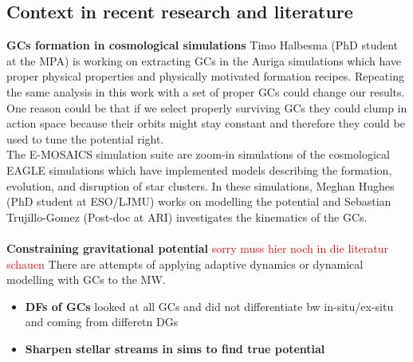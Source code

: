 \subsection{Context in recent research and literature}
\textbf{\acp{GC} formation in cosmological simulations} Timo Halbesma (PhD student at the MPA) is working on extracting \acp{GC} in the Auriga simulations which have proper physical properties and physically motivated formation recipes. Repeating the same analysis in this work with a set of proper \acp{GC} could change our results. One reason could be that if we select properly surviving \acp{GC} they could clump in action space because their orbits might stay constant and therefore they could be used to tune the potential right.\\
The E-MOSAICS simulation suite \citep{Pfeffer...E-MOSAICS...2018, Kruijssen...E-MOSAICS.MW..2018} are zoom-in simulations of the cosmological EAGLE \citep{Schaye...EAGLE...2015} simulations which have implemented models describing the formation, evolution, and disruption of star clusters. In these simulations, Meghan Hughes (PhD student at ESO/LJMU) works on modelling the potential and Sebastian Trujillo-Gomez (Post-doc at ARI) investigates the kinematics of the \acp{GC}. 
\\\\
\textbf{Constraining gravitational potential}
\textcolor{red}{sorry muss hier noch in die literatur schauen}
There are attempts of applying adaptive dynamics or dynamical modelling with \acp{GC} to the \ac{MW}.
\begin{itemize}
    \item \textbf{\acp{DF} of \acp{GC}} \citep{Posti...MWmassGCs...2018}
    looked at all GCs and did not differentiate bw in-situ/ex-situ and coming from differetn \acp{DG}
    \item \textbf{Sharpen stellar streams in sims to find true potential} \citep{Sanderson...streams..adaptivedyn...2015, Sanderson...gravpotstreams...2017}
\end{itemize}
\citet{Jean-Baptiste...accactionspace...2017}

